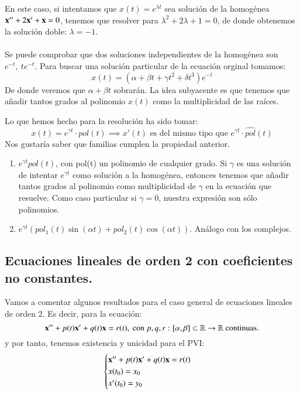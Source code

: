 \begin{eg}[Ecuación lineal de orden 2: $\mbf{x}''+3\mbf{x}'+\mbf{x}=te^{-t}$]
    En este caso, si intentamos que $x(t) = e^{\lambda t}$ sea solución de la homogénea $\mathbf{x}'' + 2\mathbf{x}' + \mathbf{x} = 0$, tenemos que resolver para $\lambda^2 + 2\lambda + 1 = 0$, de donde obtenemos la solución doble: $\lambda = -1$.\\\\
    Se puede comprobar que dos soluciones independientes de la homogénea son $e^{-t},\ te^{-t}$. Para buscar una solución particular de la ecuación orginal tomamos:
    $$
        x(t) = (\alpha + \beta t + \gamma t^2 + \delta t^3) e^{-t}
    $$
    De donde veremos que $\alpha + \beta t$ sobrarán. La idea subyacente es que tenemos que añadir tantos grados al polinomio $x(t)$ como la multiplicidad de las raíces.
\end{eg}
\begin{obs}
    Lo que hemos hecho para la resolución ha sido tomar:
    $$
        x(t) = e^{\gamma t} \cdot pol(t) \implies x'(t) \text{ es del mismo tipo que } e^{\gamma t} \cdot \hat{pol}(t)
    $$
    Nos gustaría saber que familias cumplen la propiedad anterior.
    \begin{enumerate}
        \item $e^{\gamma t} pol(t)$, con pol(t) un polinomio de cualquier grado. Si $\gamma$ es una solución de intentar $e^{\gamma t}$ como solución a la homogénea, entonces tenemos que añadir tantos grados al polinomio como multiplicidad de $\gamma$ en la ecuación que resuelve. Como caso particular si $\gamma = 0$, nuestra expresión son sólo polinomios.
        \item $e^{\gamma t} (pol_1(t) \sin(\alpha t) + pol_2(t)\cos(\alpha t))$. Análogo con los complejos. %
    \end{enumerate}
\end{obs}
\subsection{Ecuaciones lineales de orden 2 con coeficientes no constantes.}

Vamos a comentar algunos resultados para el caso general de ecuaciones lineales de orden 2. Es decir, para la ecuación:
$$
    \mathbf{x}'' + p(t)\mathbf{x}' + q(t)\mathbf{x} = r(t), \text{ con } p,q,r : [\alpha, \beta] \subset \mathbb{R} \to \mathbb{R} \text{ continuas.}
$$
y por tanto, tenemos existencia y unicidad para el PVI:
$$
    \begin{cases}
        \mathbf{x}'' + p(t)\mathbf{x}' + q(t)\mathbf{x} = r(t)\\
        x(t_0) = x_0\\
        x'(t_0) = y_0
    \end{cases}
$$


